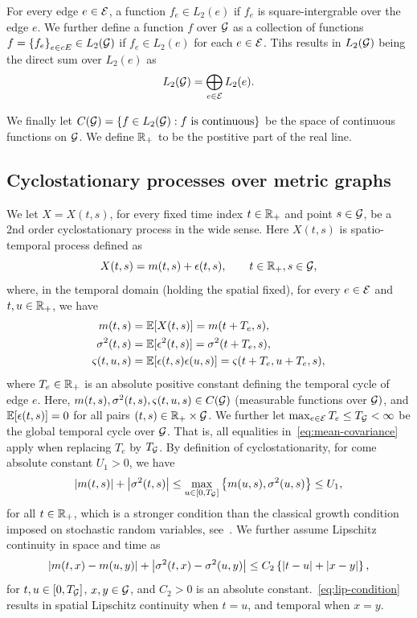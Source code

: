\documentclass[12pt]{article}
\begin{document}
{{For every edge $e\in \mathcal{E}$, a function $f_e \in L_2(e)$ if $f_e$ is square-intergrable over the edge $e$. We further define a function $f$ over $\mathcal{G}$ as a collection of functions $f = \left\{f_e\right\}_{e \in cE} \in L_2(\mathcal{G})$ if $f_e \in L_2(e)$ for each $e \in \mathcal{E}$. Tihs results in $L_2(\mathcal{G})$ being the direct sum over $L_2(e)$ as 
\[L_2(\mathcal{G}) = \bigoplus_{e \in \mathcal{E}} L_2(e). \]

We finally let $C(\mathcal{G}) = \left\{f \in L_2(\mathcal{G}): f \text{ is continuous}\right\}$ be the space of continuous functions on $\mathcal{G}$. We define $\mathbb{R}_+$ to be the postitive part of the real line.

\subsection{Cyclostationary processes over metric graphs}\label{sec:cyclostationary}
We let $X=X(t, s)$, for every fixed time index $t \in \mathbb{R}_+$ and point $s \in \mathcal{G}$, be a 2nd order cyclostationary process in the wide sense. Here $X(t,s)$ is spatio-temporal process defined as
\begin{equation} \label{eq:speed}
X(t,s) = m(t, s) + \epsilon(t, s), \qquad t \in \mathbb{R}_+, s \in \mathcal{G},
\end{equation}
where, in the temporal domain (holding the spatial fixed), for every $e \in \mathcal{E}$ and $t, u \in \mathbb{R}_+$, we have
\begin{subequations}
\label{eq:mean-covariance}
\begin{align}
    m(t, s) & =\mathbb{E}[X(t,s)] = m(t + T_e, s), \label{eq:mean}\\
    \sigma^2(t, s) &= \mathbb{E}[\epsilon^2(t,s)] = \sigma^2(t +T_e, s), \label{eq:variance}\\
    \varsigma(t, u, s) &= \mathbb{E}[\epsilon(t,s)\epsilon(u, s)] = \varsigma(t +T_e, u+T_e, s) \label{eq:covariance},
\end{align}
\end{subequations}
where $T_e \in \mathbb{R}_+$ is an absolute positive constant defining the temporal cycle of edge $e$. Here, $m(t,s), \sigma^2(t,s), \varsigma(t,u, s) \in C(\mathcal{G})$ (measurable functions over $\mathcal{G})$, and $\mathbb{E}[\epsilon(t,s)]=0$ for all pairs $(t, s) \in \mathbb{R}_+ \times \mathcal{G}$.  We further let $\max_{e\in \mathcal{E}} T_e \leq T_{\mathcal{G}} < \infty$ be the global temporal cycle over $\mathcal{G}$. That is, all equalities in~\eqref{eq:mean-covariance} apply when replacing $T_e$ by $T_{\mathcal{G}}$. By definition of cyclostationarity, for come absolute constant $U_1>0$, we have
\[\left|m(t,s)\right| + \left|\sigma^2(t,s)\right| \leq \max_{u \in [0, T_{\mathcal{G}}]}\left\{m(u, s), \sigma^2(u, s)\right\} \leq U_1,\]
for all $t\in \mathbb{R}_+$, which is a stronger condition than the classical growth condition imposed on stochastic random variables, see~\citet[Thm.~5.2.1]{oksendal2013stochastic}. We further assume Lipschitz continuity in space and time as 
\begin{equation}\label{eq:lip-condition}
    \left|m(t,x) - m(u, y)\right| + \left|\sigma^2(t,x) - \sigma^2(u,y)\right| \leq C_2 \left\{\left|t-u\right| + \left|x-y\right|\right\},
\end{equation}
for $t, u \in \left[0, T_{\mathcal{G}}\right]$, $x,y \in \mathcal{G}$, and $C_2>0$ is an absolute constant.~\eqref{eq:lip-condition} results in spatial Lipschitz continuity when $t=u$, and temporal when $x=y$. 

}}
\end{document}
